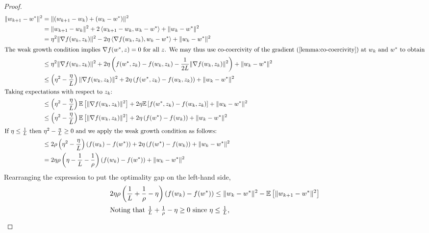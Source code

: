 \iffalse
\begin{proof}
   \begin{align*}
       \norm{\wkk - \wopt}^2 &= \norm{(\wkk - \wk) + (\wk - \wopt)}^2\\
                             &= \norm{\wkk - \wk}^2 + 2 \abr{\wkk - \wk, \wk - \wopt} + \norm{\wk - \wopt}^2\\
                             &= \eta^2 \norm{\grad(\wk, \zk)}^2 - 2 \eta \abr{\grad(\wk, \zk), \wk - \wopt} + \norm{\wk - \wopt}^2\\ 
                             \intertext{The weak growth condition implies \( \grad(\wopt, \z) = 0 \) for all \( \z \). We may thus use co-coercivity of the gradient (\autoref{lemma:co-coercivity}) at \( \wk \) and \( \wopt \) to obtain}
                             &\leq \eta^2 \norm{\grad(\wk, \zk)}^2 + 2 \eta \rbr{f(\wopt, \zk) - f(\wk, \zk) - \frac{1}{2L} \norm{\grad(\wk, \zk)}^2}  + \norm{\wk - \wopt}^2\\ 
                             &\leq \rbr{\eta^2 - \frac{\eta}{L}} \norm{\grad(\wk, \zk)}^2 + 2 \eta \rbr{f(\wopt, \zk) - f(\wk, \zk)} + \norm{\wk - \wopt}^2\\
                             \intertext{Taking expectations with respect to \( \zk \):}
                             &\leq \rbr{\eta^2 - \frac{\eta}{L}} \E \sbr{\norm{\grad(\wk, \zk)}^2} + 2 \eta \E\sbr{f(\wopt, \zk) - f(\wk, \zk)} + \norm{\wk - \wopt}^2\\
                             &\leq \rbr{\eta^2 - \frac{\eta}{L}} \E \sbr{\norm{\grad(\wk, \zk)}^2} + 2 \eta \rbr{f(\wopt) - f(\wk)} + \norm{\wk - \wopt}^2\\
                             \intertext{If \( \eta \leq \frac{1}{L} \) then \( \eta^2 - \frac{\eta}{L} \geq 0 \) and we apply the weak growth condition as follows: }
                             &\leq 2 \rho \rbr{\eta^2- \frac{\eta}{L}}\rbr{\f(\wk) - f(\wopt)} + 2 \eta\rbr{f(\wopt) - f(\wk)} + \norm{\wk - \wopt}^2\\ 
                             &= 2\eta \rho \rbr{\eta - \frac{1}{L} - \frac{1}{\rho}}\rbr{f(\wk) - f(\wopt)} + \norm{\wk - \wopt}^2
\end{align*}
Rearranging the expression to put the optimality gap on the left-hand side,
\begin{align*}
    2 \eta \rho \rbr{\frac{1}{L} + \frac{1}{\rho} - \eta}\rbr{f(\wk) - f(\wopt)} &\leq \norm{\wk - \wopt}^2 - \E\sbr{\norm{\wkk - \wopt}^2}\\ 
\intertext{Noting that \( \frac{1}{L} + \frac{1}{\rho} - \eta \geq 0 \) since \( \eta \leq \frac{1}{L} \), }

\end{align*}
\end{proof}
